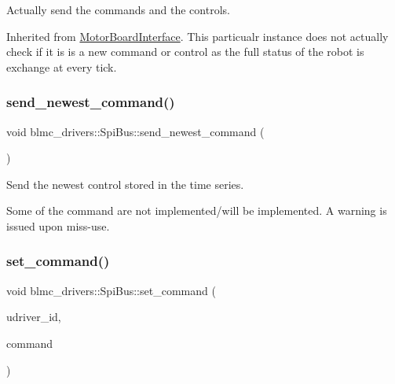 Actually send the commands and the controls. 

Inherited from \hyperlink{classblmc__drivers_1_1MotorBoardInterface}{Motor\+Board\+Interface}. This particualr instance does not actually check if it is is a new command or control as the full status of the robot is exchange at every tick. \mbox{\label{classblmc__drivers_1_1SpiBus_ad1332260ea455812464723ede9f2c1d1}} 
\subsubsection{\texorpdfstring{send\+\_\+newest\+\_\+command()}{send\_newest\_command()}}
{\footnotesize\ttfamily void blmc\+\_\+drivers\+::\+Spi\+Bus\+::send\+\_\+newest\+\_\+command (\begin{DoxyParamCaption}{ }\end{DoxyParamCaption})\hspace{0.3cm}{\ttfamily [private]}}



Send the newest control stored in the time series. 

Some of the command are not implemented/will be implemented. A warning is issued upon miss-\/use. \mbox{\label{classblmc__drivers_1_1SpiBus_af5ca19baccb36befbbc697cdd2e2922c}} 
\subsubsection{\texorpdfstring{set\+\_\+command()}{set\_command()}}
{\footnotesize\ttfamily void blmc\+\_\+drivers\+::\+Spi\+Bus\+::set\+\_\+command (\begin{DoxyParamCaption}\item[{const size\+\_\+t}]{udriver\+\_\+id,  }\item[{const \hyperlink{classblmc__drivers_1_1MotorBoardCommand}{Motor\+Board\+Command} \&}]{command }\end{DoxyParamCaption})\hspace{0.3cm}{\ttfamily [virtual]}}



